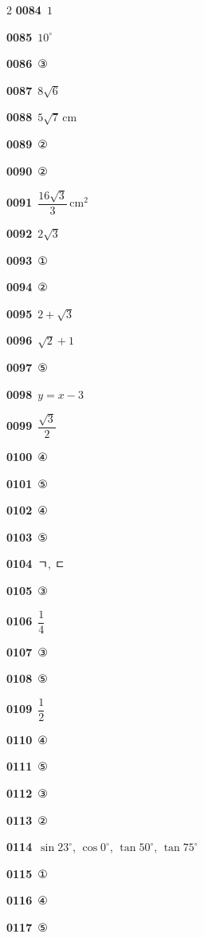 \documentclass[10pt,a4paper]{article}
\begin{document}
\begin{multicols}{2}
\noindent\textbf{0084}\ $1$\par
\noindent\textbf{0085}\ $10^\circ$\par
\noindent\textbf{0086}\ ③\par
\noindent\textbf{0087}\ $8\sqrt{6}$\par
\noindent\textbf{0088}\ $5\sqrt{7}\,\mathrm{cm}$\par
\noindent\textbf{0089}\ ②\par
\noindent\textbf{0090}\ ②\par
\noindent\textbf{0091}\ $\dfrac{16\sqrt{3}}{3}\,\mathrm{cm}^2$\par
\noindent\textbf{0092}\ $2\sqrt{3}$\par
\noindent\textbf{0093}\ ①\par
\noindent\textbf{0094}\ ②\par
\noindent\textbf{0095}\ $2+\sqrt{3}$\par
\noindent\textbf{0096}\ $\sqrt{2}+1$\par
\noindent\textbf{0097}\ ⑤\par
\noindent\textbf{0098}\ $y=x-3$\par
\noindent\textbf{0099}\ $\dfrac{\sqrt{3}}{2}$\par
\noindent\textbf{0100}\ ④\par
\noindent\textbf{0101}\ ⑤\par
\noindent\textbf{0102}\ ④\par
\noindent\textbf{0103}\ ⑤\par
\noindent\textbf{0104}\ ㄱ, ㄷ\par
\noindent\textbf{0105}\ ③\par
\noindent\textbf{0106}\ $\dfrac{1}{4}$\par
\noindent\textbf{0107}\ ③\par
\noindent\textbf{0108}\ ⑤\par
\noindent\textbf{0109}\ $\dfrac{1}{2}$\par
\noindent\textbf{0110}\ ④\par
\noindent\textbf{0111}\ ⑤\par
\noindent\textbf{0112}\ ③\par
\noindent\textbf{0113}\ ②\par
\noindent\textbf{0114}\ $\sin 23^\circ$, $\cos 0^\circ$, $\tan 50^\circ$, $\tan 75^\circ$\par
\noindent\textbf{0115}\ ①\par
\noindent\textbf{0116}\ ④\par
\noindent\textbf{0117}\ ⑤\par

\end{multicols}
\end{document}

